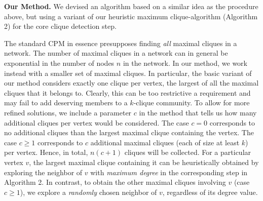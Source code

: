 {\bf Our Method. } We devised an algorithm based on a similar idea as the procedure
above, but using a variant of our heuristic maximum clique-algorithm 
(Algorithm 2) for the core clique detection step. 

The standard CPM in essence presupposes finding {\em all} maximal cliques in a network.
The number of maximal cliques in a network can in general be exponential in the number of nodes $n$ in the network. In our method, we work instead with a smaller set of maximal cliques. In particular, the basic variant of our method considers exactly one clique per vertex, the largest of all the maximal cliques that it belongs to. Clearly, this can be too restrictive a requirement and may fail to add deserving members to a $k$-clique community. 
To allow for more refined solutions, we include a parameter $c$
in the method that tells us how many additional cliques per vertex would be considered.
The case $c=0$ corresponds to no additional cliques than the largest maximal clique containing the vertex. The case $c\geq1$ corresponds to $c$ additional maximal cliques (each of size at least $k$)
per vertex. Hence, in total, $n(c+1)$ cliques will be collected. For a particular vertex $v$, the largest maximal clique containing it 
can be heuristically obtained by exploring the neighbor of $v$ with {\em maximum degree} 
in the corresponding step in Algorithm 2.
In contrast, to obtain the other maximal cliques involving $v$ (case $c\geq1$),
we explore a {\em randomly} chosen neighbor of $v$, regardless of its degree value.




